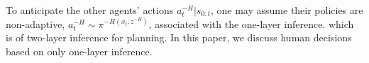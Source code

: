 \documentclass[letterpaper, 10 pt, conference]{ieeeconf}  %
\begin{document}
To anticipate the other agents' actions $a^{-H}_{t}|s_{0:t}$, one may assume 
their policies are non-adaptive, $a^{-H}_t \sim \pi^{-H(x_t,z^{-H})}$, 
associated with the one-layer inference.
which is of two-layer inference for planning. In this paper, we discuss human 
decisions based on only one-layer inference.


\vspace{-0.3em}
\end{document}
